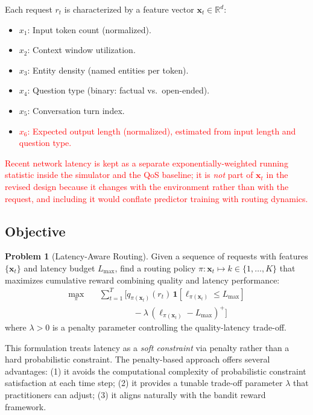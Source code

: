 \documentclass[final,3p,twocolumn,authoryear]{elsarticle}
\newcommand{\rev}[1]{\textcolor{red}{#1}}
\theoremstyle{plain}
\theoremstyle{definition}
\newtheorem{problem}{Problem}
\begin{document}
Each request $r_t$ is characterized by a feature vector $\mathbf{x}_t \in \mathbb{R}^d$:
\begin{itemize}
  \item $x_1$: Input token count (normalized).
  \item $x_2$: Context window utilization.
  \item $x_3$: Entity density (named entities per token).
  \item $x_4$: Question type (binary: factual vs.\ open-ended).
  \item $x_5$: Conversation turn index.
  \item \rev{$x_6$: Expected output length (normalized), estimated from input length and question type.}
\end{itemize}
\rev{Recent network latency is kept as a separate exponentially-weighted running statistic inside the simulator and the QoS baseline; it is \emph{not} part of $\mathbf{x}_t$ in the revised design because it changes with the environment rather than with the request, and including it would conflate predictor training with routing dynamics.}

\subsection{Objective}

\begin{problem}[Latency-Aware Routing]
Given a sequence of requests with features $\{\mathbf{x}_t\}$ and latency budget $L_{\max}$, find a routing policy $\pi: \mathbf{x}_t \mapsto k \in \{1, \ldots, K\}$ that maximizes cumulative reward combining quality and latency performance:
\begin{align}
  \max_\pi \quad
  & \sum_{t=1}^{T} \Big[
      q_{\pi(\mathbf{x}_t)}(r_t)\,
      \mathbf{1}[\ell_{\pi(\mathbf{x}_t)} \leq L_{\max}] \nonumber\\
  &\hspace{4em}
      {}-\lambda\,(\ell_{\pi(\mathbf{x}_t)} - L_{\max})^+
    \Big]
\end{align}
where $\lambda > 0$ is a penalty parameter controlling the quality-latency trade-off.
\end{problem}

This formulation treats latency as a \emph{soft constraint} via penalty rather than a hard probabilistic constraint.
The penalty-based approach offers several advantages: (1) it avoids the computational complexity of probabilistic constraint satisfaction at each time step; (2) it provides a tunable trade-off parameter $\lambda$ that practitioners can adjust; (3) it aligns naturally with the bandit reward framework.
\end{document}
